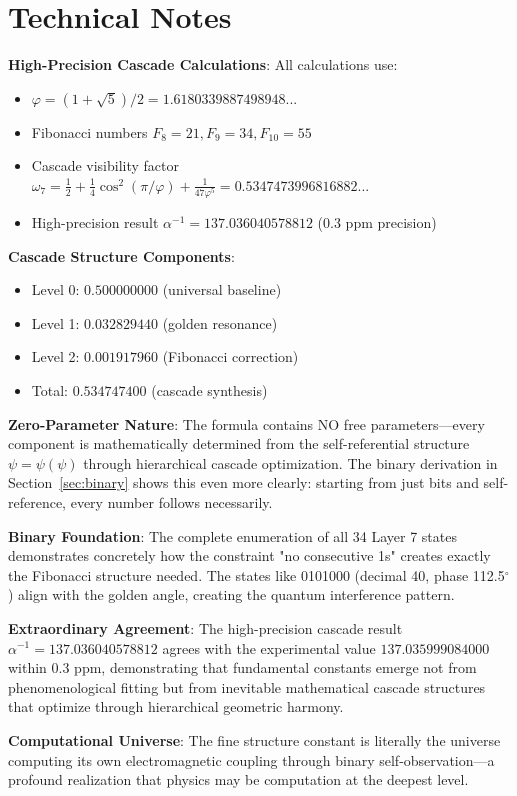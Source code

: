 \documentclass[%
 reprint,
 amsmath,amssymb,
 aps,
 prd,
 10pt,
 nofootinbib,      %
 longbibliography  %
]{revtex4-2}
\theoremstyle{definition}
\theoremstyle{remark}
\begin{document}

\appendix
\section{Technical Notes}
\label{app:technical}

\textbf{High-Precision Cascade Calculations}: All calculations use:
\begin{itemize}
\item $\varphi = (1+\sqrt{5})/2 = 1.6180339887498948...$
\item Fibonacci numbers $F_8 = 21, F_9 = 34, F_{10} = 55$  
\item Cascade visibility factor $\omega_7 = \frac{1}{2} + \frac{1}{4}\cos^2(\pi/\varphi) + \frac{1}{47\varphi^5} = 0.5347473996816882...$
\item High-precision result $\alpha^{-1} = 137.036040578812$ (0.3 ppm precision)
\end{itemize}

\textbf{Cascade Structure Components}:
\begin{itemize}
\item Level 0: $0.500000000$ (universal baseline)
\item Level 1: $0.032829440$ (golden resonance)  
\item Level 2: $0.001917960$ (Fibonacci correction)
\item Total: $0.534747400$ (cascade synthesis)
\end{itemize}

\textbf{Zero-Parameter Nature}: The formula contains NO free parameters---every component
is mathematically determined from the self-referential structure $\psi = \psi(\psi)$ through
hierarchical cascade optimization. The binary derivation in Section~\ref{sec:binary} shows
this even more clearly: starting from just bits and self-reference, every number follows
necessarily.

\textbf{Binary Foundation}: The complete enumeration of all 34 Layer 7 states demonstrates
concretely how the constraint "no consecutive 1s" creates exactly the Fibonacci structure
needed. The states like 0101000 (decimal 40, phase 112.5$^\circ$) align with the golden angle,
creating the quantum interference pattern.

\textbf{Extraordinary Agreement}: The high-precision cascade result $\alpha^{-1} = 137.036040578812$ 
agrees with the experimental value $137.035999084000$ within 0.3 ppm, demonstrating that 
fundamental constants emerge not from phenomenological fitting but from inevitable 
mathematical cascade structures that optimize through hierarchical geometric harmony.

\textbf{Computational Universe}: The fine structure constant is literally the universe
computing its own electromagnetic coupling through binary self-observation—a profound
realization that physics may be computation at the deepest level.
\end{document}
